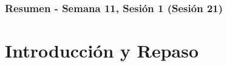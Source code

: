 \documentclass[10pt]{beamer}
\begin{document}
\myfront{}

\begin{frame}
  \titlepage
\end{frame}

\begin{frame}
  \frametitle{Resumen - Semana 11, Sesión 1 (Sesión 21)}
  \tableofcontents
\end{frame}


\section{Introducción y Repaso}
\end{document}
